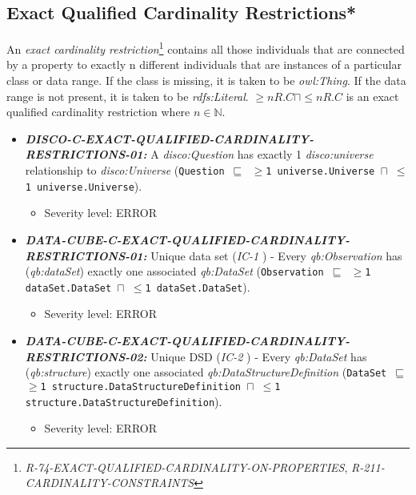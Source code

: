 \documentclass{llncs}
\newcommand{\ms}[1]{\texttt{#1}}
\begin{document}
\subsection{Exact Qualified Cardinality Restrictions*}

An \emph{exact cardinality restriction}\footnote{{\em R-74-EXACT-QUALIFIED-CARDINALITY-ON-PROPERTIES}, {\em R-211-CARDINALITY-CONSTRAINTS}} contains all those individuals that are connected by a property to exactly n different individuals that are instances of a particular class or data range. 
If the class is missing, it is taken to be \emph{owl:Thing}. 
If the data range is not present, it is taken to be \emph{rdfs:Literal}.
$\geq n R. C \sqcap \leq n R. C $ is an exact qualified cardinality restriction where $n \in \mathbb{N}$.

\begin{itemize}
	\item \textbf{{\em DISCO-C-EXACT-QUALIFIED-CARDINALITY-RESTRICTIONS-01:}}
A {\em disco:Question} has exactly 1 {\em disco:universe} relationship to {\em disco:Universe} (\ms{Question $\sqsubseteq$ $\geq$1 universe.Universe $\sqcap$ $\leq$1 universe.Universe}).
  \begin{itemize}
		\item Severity level: ERROR
	\end{itemize}
\end{itemize}

\begin{itemize}
	\item \textbf{{\em DATA-CUBE-C-EXACT-QUALIFIED-CARDINALITY-RESTRICTIONS-01:}}
	Unique data set (\emph{IC-1} \cite{CyganiakReynolds2014}) -  
	Every \emph{qb:Observation} has (\emph{qb:dataSet}) exactly one associated \emph{qb:DataSet} (\ms{Observation $\sqsubseteq$ $\geq$1 dataSet.DataSet $\sqcap$ $\leq$1 dataSet.DataSet}). 
	\begin{itemize}
		\item Severity level: ERROR
	\end{itemize}
	\item \textbf{{\em DATA-CUBE-C-EXACT-QUALIFIED-CARDINALITY-RESTRICTIONS-02:}}
	Unique DSD (\emph{IC-2} \cite{CyganiakReynolds2014}) -  
	Every \emph{qb:DataSet} has (\emph{qb:structure}) exactly one associated \emph{qb:DataStructureDefinition} (\ms{DataSet $\sqsubseteq$ $\geq$1 structure.DataStructureDefinition $\sqcap$ $\leq$1 structure.DataStructureDefinition}). 
	\begin{itemize}
		\item Severity level: ERROR
	\end{itemize}
\end{itemize}
\end{document}
